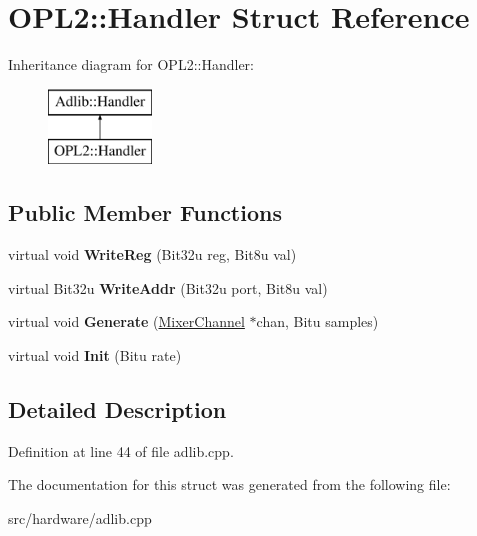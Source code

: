 \hypertarget{structOPL2_1_1Handler}{\section{O\-P\-L2\-:\-:Handler Struct Reference}
\label{structOPL2_1_1Handler}
}
Inheritance diagram for O\-P\-L2\-:\-:Handler\-:\begin{figure}[H]
\begin{center}
\leavevmode
\includegraphics[height=2.000000cm]{structOPL2_1_1Handler}
\end{center}
\end{figure}
\subsection*{Public Member Functions}
\begin{DoxyCompactItemize}
\item 
\hypertarget{structOPL2_1_1Handler_abb646d55a924a8f63f8886aa2424011c}{virtual void {\bfseries Write\-Reg} (Bit32u reg, Bit8u val)}\label{structOPL2_1_1Handler_abb646d55a924a8f63f8886aa2424011c}

\item 
\hypertarget{structOPL2_1_1Handler_a4ce8eb3de6766097896a65d6a0add8eb}{virtual Bit32u {\bfseries Write\-Addr} (Bit32u port, Bit8u val)}\label{structOPL2_1_1Handler_a4ce8eb3de6766097896a65d6a0add8eb}

\item 
\hypertarget{structOPL2_1_1Handler_a6e5217a83415a24708e245e86c27180d}{virtual void {\bfseries Generate} (\hyperlink{classMixerChannel}{Mixer\-Channel} $\ast$chan, Bitu samples)}\label{structOPL2_1_1Handler_a6e5217a83415a24708e245e86c27180d}

\item 
\hypertarget{structOPL2_1_1Handler_aaaf822d10e0b19c29aa6a2bc5ad2a9df}{virtual void {\bfseries Init} (Bitu rate)}\label{structOPL2_1_1Handler_aaaf822d10e0b19c29aa6a2bc5ad2a9df}

\end{DoxyCompactItemize}


\subsection{Detailed Description}


Definition at line 44 of file adlib.\-cpp.



The documentation for this struct was generated from the following file\-:\begin{DoxyCompactItemize}
\item 
src/hardware/adlib.\-cpp\end{DoxyCompactItemize}
